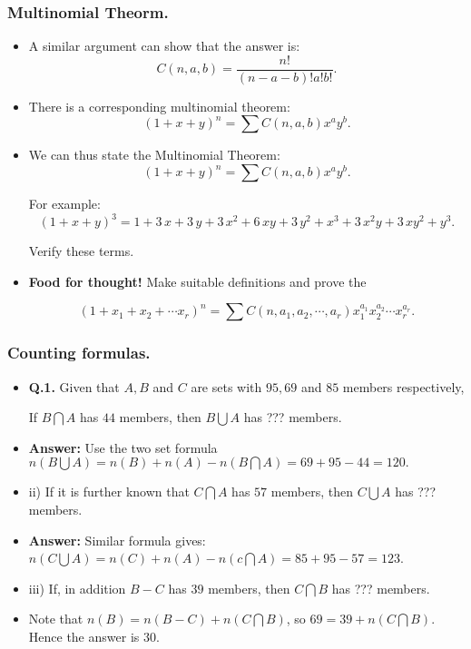 
\begin{frame}%
  \frametitle{Multinomial Theorm.}
  \begin{itemize}%

\item A similar argument can show that the answer is:
$$C(n,a,b)=\frac{n!}{(n-a-b)!a!b!}.$$

\item There is a corresponding multinomial theorem:
$$(1+x+y)^n = \sum C(n,a,b)x^ay^b .$$

\item We can thus state the Multinomial Theorem:
$$(1+x+y)^n = \sum C(n,a,b)x^ay^b.$$

For example:
$$(1+x+y)^3 = 1+3\,x+3\,y+3\,{x}^{2}+6\,xy+3\,{y}^{2}+{x}^{3}+3\,{x}^{2}y+3\,x{y}^{2
}+{y}^{3}.$$

Verify these terms.

\item {\bf Food for thought!} Make suitable definitions and prove the

$$(1+x_1+x_2+\cdots x_r )^n = \sum C(n,a_1,a_2,\cdots
,a_r)x_1^{a_1}x_2^{a_2}\cdots x_r^{a_r}.$$




\end{itemize}
\end{frame}



\begin{frame} %
\frametitle{Counting formulas.}
  \begin{itemize}%

\item {\bf Q.1.}
Given that $A, B$ and $C$ are sets with $95, 69$ and $85$ members respectively,

If $B\bigcap A$  has $44$ members, then $B\bigcup A$ has  ???  members.

\item {\bf Answer:} Use the two set formula
$n(B \bigcup A) = n(B) + n(A) - n(B\bigcap A) = 69 + 95 - 44 = 120.$


\item
ii) If it is further known that $C\bigcap A$ has $57$ members, then $C\bigcup A$ has   ??? members.

\item {\bf Answer:} Similar formula gives: $n(C\bigcup A) = n(C) + n(A)
- n(c\bigcap A) = 85 + 95 - 57 = 123$.

\item 
iii) If, in addition $B-C$ has $39$ members, then $C\bigcap B$ has ???  members.

\item Note that $n(B) = n(B-C) + n(C\bigcap B)$, so $69 = 39 + n(C\bigcap B)$.
Hence the answer is $30$.




\end{itemize}

\end{frame}


